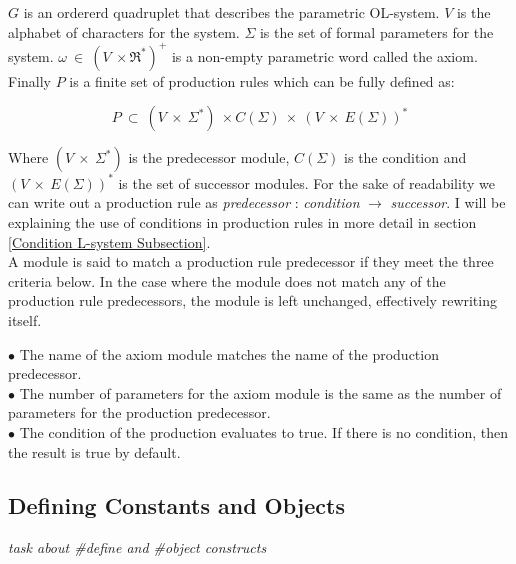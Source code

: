 \begin{flushleft}
$G$ is an ordererd quadruplet that describes the parametric OL-system. $V$ is the alphabet of characters for the system. $\Sigma$ is the set of formal parameters for the system. $\omega~ \in~ (V~ \times \Re^*)^+$ is a non-empty parametric word called the axiom. Finally $P$ is a finite set of production rules which can be fully defined as:

\vspace{5mm}

\begin{equation}
P~ \subset~ (V~ \times~ \Sigma^*)~ \times C(\Sigma)~ \times~ (V~ \times~ E(\Sigma))^*
\end{equation}

\vspace{5mm} 

Where $(V~ \times~ \Sigma^*) $ is the predecessor module, $C(\Sigma) $ is the condition and $(V~ \times~ E(\Sigma))^* $ is the set of successor modules. For the sake of readability we can write out a production rule as \textit{predecessor} : \textit{condition} $\rightarrow$ \textit{successor}. I will be explaining the use of conditions in production rules in more detail in section \ref{Condition L-system Subsection}.\\
A module is said to match a production rule predecessor if they meet the three criteria below. In the case where the module does not match any of the production rule predecessors, the module is left unchanged, effectively rewriting itself. \\

\vspace{5mm}

$\bullet$ The name of the axiom module matches the name of the production predecessor. \\
$\bullet$ The number of parameters for the axiom module is the same as the number of parameters for the production predecessor. \\
$\bullet$ The condition of the production evaluates to true. If there is no condition, then the result is true by default.\\

\vspace{5mm}

\subsection{Defining Constants and Objects}

\textit{task about #define and #object constructs}


\end{flushleft}
